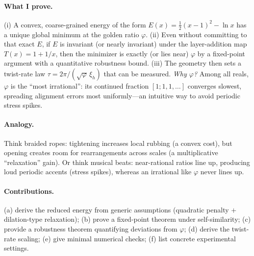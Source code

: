 \documentclass[11pt]{article}
\theoremstyle{remark}
\theoremstyle{definition}
\newcommand{\ph}{\varphi}
\begin{document}
\paragraph{What I prove.} (i) A convex, coarse-grained energy of the form $E(x)=\tfrac12(x-1)^2-\ln x$ has a unique global minimum at the golden ratio $\ph$. (ii) Even without committing to that exact $E$, if $E$ is invariant (or nearly invariant) under the layer-addition map $T(x)=1+1/x$, then the minimizer is exactly (or lies near) $\ph$ by a fixed-point argument with a quantitative robustness bound. (iii) The geometry then sets a twist-rate law $\tau=2\pi/(\sqrt{\ph}\,\xi_h)$ that can be measured. \emph{Why $\ph$?} Among all reals, $\ph$ is the ``most irrational'': its continued fraction $[1;1,1,\ldots]$ converges slowest, spreading alignment errors most uniformly---an intuitive way to avoid periodic stress spikes.

\paragraph{Analogy.} Think braided ropes: tightening increases local rubbing (a convex cost), but opening creates room for rearrangements across scales (a multiplicative ``relaxation'' gain). Or think musical beats: near-rational ratios line up, producing loud periodic accents (stress spikes), whereas an irrational like $\ph$ never lines up.

\paragraph{Contributions.} (a) derive the reduced energy from generic assumptions (quadratic penalty $+$ dilation-type relaxation); (b) prove a fixed-point theorem under self-similarity; (c) provide a robustness theorem quantifying deviations from $\ph$; (d) derive the twist-rate scaling; (e) give minimal numerical checks; (f) list concrete experimental settings.
\end{document}
